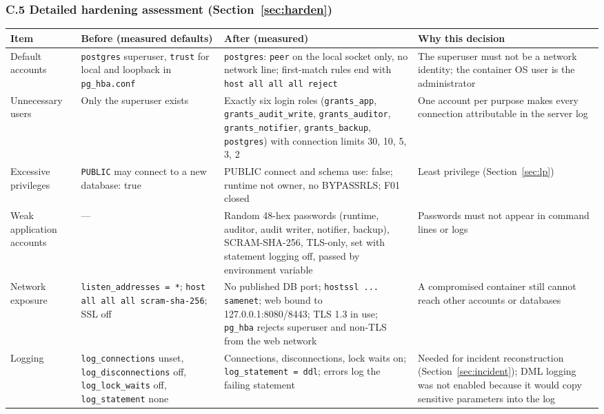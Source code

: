\documentclass[10pt,a4paper]{article}
\newcommand{\code}[1]{\nolinkurl{#1}}
\begin{document}
\subsubsection*{C.5 Detailed hardening assessment (Section~\ref{sec:harden})}
\begin{center}\scriptsize
\begin{longtable}{@{}L{2.21cm}L{3.78cm}L{4.14cm}L{4.51cm}@{}}
\toprule\textbf{Item} & \textbf{Before (measured defaults)} & \textbf{After (measured)} & \textbf{Why this decision}\\\midrule\endhead
Default accounts & \code{postgres} superuser, \code{trust} for local and loopback in \code{pg_hba.conf} & \code{postgres}: \code{peer} on the local socket only, no network line; first-match rules end with \code{host all all all reject} & The superuser must not be a network identity; the container OS user is the administrator\\
Unnecessary users & Only the superuser exists & Exactly six login roles (\code{grants_app}, \code{grants_audit_write}, \code{grants_auditor}, \code{grants_notifier}, \code{grants_backup}, \code{postgres}) with connection limits 30, 10, 5, 3, 2 & One account per purpose makes every connection attributable in the server log\\
Excessive privileges & \code{PUBLIC} may connect to a new database: true & PUBLIC connect and schema use: false; runtime not owner, no BYPASSRLS; F01 closed & Least privilege (Section~\ref{sec:lp})\\
Weak application accounts & --- & Random 48-hex passwords (runtime, auditor, audit writer, notifier, backup), SCRAM-SHA-256, TLS-only, set with statement logging off, passed by environment variable & Passwords must not appear in command lines or logs\\
Network exposure & \code{listen_addresses = *}; \code{host all all all scram-sha-256}; SSL off & No published DB port; \code{hostssl ... samenet}; web bound to 127.0.0.1:8080/8443; TLS 1.3 in use; \code{pg_hba} rejects superuser and non-TLS from the web network & A compromised container still cannot reach other accounts or databases\\
Logging & \code{log_connections} unset, \code{log_disconnections} off, \code{log_lock_waits} off, \code{log_statement} none & Connections, disconnections, lock waits on; \code{log_statement = ddl}; errors log the failing statement & Needed for incident reconstruction (Section~\ref{sec:incident}); DML logging was not enabled because it would copy sensitive parameters into the log\\

\end{longtable}
\end{center}
\end{document}
